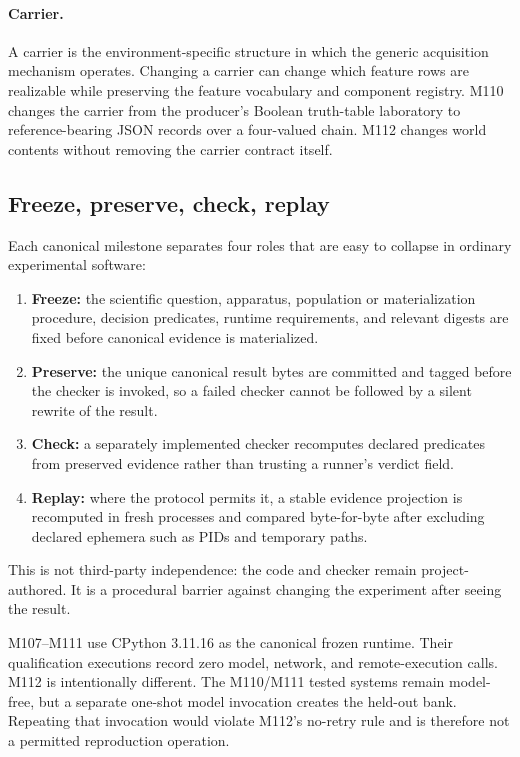 \paragraph{Carrier.} A carrier is the environment-specific structure in which the generic acquisition mechanism operates. Changing a carrier can change which feature rows are realizable while preserving the feature vocabulary and component registry. M110 changes the carrier from the producer's Boolean truth-table laboratory to reference-bearing JSON records over a four-valued chain. M112 changes world contents without removing the carrier contract itself.

\subsection{Freeze, preserve, check, replay}
Each canonical milestone separates four roles that are easy to collapse in ordinary experimental software:
\begin{enumerate}
  \item \textbf{Freeze:} the scientific question, apparatus, population or materialization procedure, decision predicates, runtime requirements, and relevant digests are fixed before canonical evidence is materialized.
  \item \textbf{Preserve:} the unique canonical result bytes are committed and tagged before the checker is invoked, so a failed checker cannot be followed by a silent rewrite of the result.
  \item \textbf{Check:} a separately implemented checker recomputes declared predicates from preserved evidence rather than trusting a runner's verdict field.
  \item \textbf{Replay:} where the protocol permits it, a stable evidence projection is recomputed in fresh processes and compared byte-for-byte after excluding declared ephemera such as PIDs and temporary paths.
\end{enumerate}
This is not third-party independence: the code and checker remain project-authored. It is a procedural barrier against changing the experiment after seeing the result.

M107--M111 use CPython 3.11.16 as the canonical frozen runtime. Their qualification executions record zero model, network, and remote-execution calls. M112 is intentionally different. The M110/M111 tested systems remain model-free, but a separate one-shot model invocation creates the held-out bank. Repeating that invocation would violate M112's no-retry rule and is therefore not a permitted reproduction operation.

